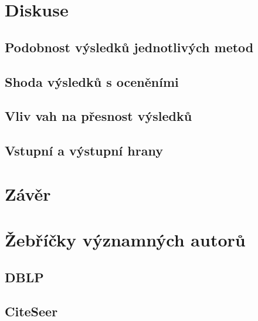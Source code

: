 \documentclass[12pt,titlepage]{report}
\begin{document}
\chapter{Diskuse}
\section{Podobnost výsledků jednotlivých metod}
\section{Shoda výsledků s oceněními}
\section{Vliv vah na přesnost výsledků}
\section{Vstupní a výstupní hrany}

\chapter{Závěr}




\clearpage\mbox{}\clearpage

\newpage
\appendix
\chapter{Žebříčky významných autorů}
\label{chapter:zebricky}

\newpage
\section{DBLP}














\section{CiteSeer}
\begin{footnotesize}
\end{footnotesize}
\end{document}
